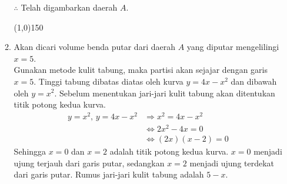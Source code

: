 \begin{enumerate}[leftmargin=*, label={\arabic*}.]
\begin{enumerate}[label={\alph*}.]
\begin{center}
\end{center}
$\therefore$ Telah digambarkan daerah $A$.
\begin{center}
    \line(1,0){150}
\end{center}
    \item Akan dicari volume benda putar dari daerah $A$ yang diputar mengelilingi $x=5$.\\
    Gunakan metode kulit tabung, maka partisi akan sejajar dengan garis $x=5$. Tinggi 
    tabung dibatas diatas oleh kurva $y=4x-x^{2}$ dan dibawah oleh $y=x^{2}$. Sebelum menentukan 
    jari-jari kulit tabung akan ditentukan titik potong kedua kurva.
    \begin{align*}
        y = x^{2},\,y=4x-x^{2} &\Longrightarrow x^{2}=4x-x^{2}\\
        & \iff 2x^{2}-4x=0\\
        & \iff (2x)(x-2)=0
    \end{align*}
    Sehingga $x=0$ dan $x=2$ adalah titik potong kedua kurva. $x=0$ menjadi ujung terjauh 
    dari garis putar, sedangkan $x=2$ menjadi ujung terdekat dari garis putar. 
    Rumus jari-jari kulit tabung adalah $5-x$.


\end{enumerate}
\end{enumerate}
